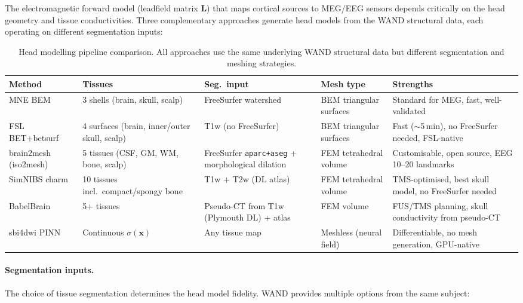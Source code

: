 \documentclass[11pt,a4paper]{article}\usepackage[]{graphicx}\usepackage[]{xcolor}
\begin{document}
The electromagnetic forward model (leadfield matrix $\mathbf{L}$) that
maps cortical sources to MEG/EEG sensors depends critically on the head
geometry and tissue conductivities. Three complementary approaches
generate head models from the WAND structural data, each operating on
different segmentation inputs:

\begin{table}[htbp]
\centering
\caption{Head modelling pipeline comparison. All approaches use the
same underlying WAND structural data but different segmentation and
meshing strategies.}
\label{tab:headmodel}
\begin{tabular}{p{2.5cm}p{2cm}p{2cm}p{2.5cm}p{3cm}}
\toprule
Method & Tissues & Seg.\ input & Mesh type & Strengths \\
\midrule
MNE BEM & 3 shells (brain, skull, scalp) & FreeSurfer watershed & BEM triangular surfaces &
  Standard for MEG, fast, well-validated \\
FSL BET+betsurf & 4 surfaces (brain, inner/outer skull, scalp) & T1w (no FreeSurfer) &
  BEM triangular surfaces & Fast ($\sim$5\,min), no FreeSurfer needed, FSL-native \\
brain2mesh (iso2mesh) & 5 tissues (CSF, GM, WM, bone, scalp) & FreeSurfer \texttt{aparc+aseg} + morphological dilation &
  FEM tetrahedral volume & Customisable, open source, EEG 10--20 landmarks \\
SimNIBS charm & 10 tissues incl.\ compact/spongy bone & T1w + T2w (DL atlas) &
  FEM tetrahedral volume & TMS-optimised, best skull model, no FreeSurfer needed \\
BabelBrain & 5+ tissues & Pseudo-CT from T1w (Plymouth DL) + atlas &
  FEM volume & FUS/TMS planning, skull conductivity from pseudo-CT \\
sbi4dwi PINN & Continuous $\sigma(\mathbf{x})$ & Any tissue map &
  Meshless (neural field) & Differentiable, no mesh generation, GPU-native \\
\bottomrule
\end{tabular}
\end{table}

\paragraph{Segmentation inputs.}
The choice of tissue segmentation determines the head model fidelity.
WAND provides multiple options from the same subject:
\end{document}
